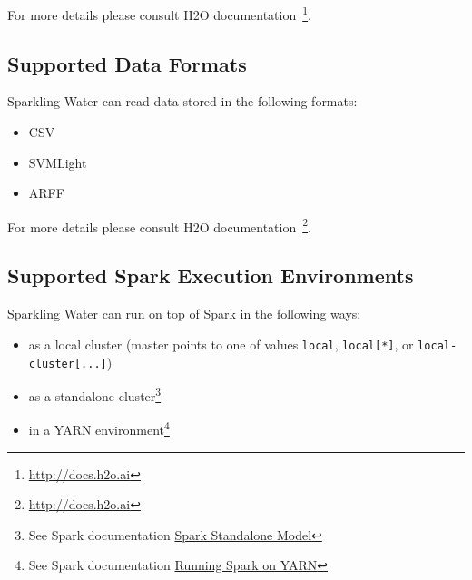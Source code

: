 For more details please consult H2O documentation~\footnote{\url{http://docs.h2o.ai}}.

\subsection{Supported Data Formats}

Sparkling Water can read data stored in the following formats:

\begin{itemize}
  \item CSV
  \item SVMLight
  \item ARFF
\end{itemize}

For more details please consult H2O documentation~\footnote{\url{http://docs.h2o.ai}}.

\subsection{Supported Spark Execution Environments}

Sparkling Water can run on top of Spark in the following ways:

\begin{itemize}
  \item as a local cluster (master points to one of values \texttt{local},
\texttt{local[*]}, or \texttt{local-cluster[...]})
  \item as a standalone cluster\footnote{See Spark documentation
\href{http://spark.apache.org/docs/latest/spark-standalone.html}{Spark
Standalone Model}}
  \item in a YARN environment\footnote{See Spark documentation \href{http://spark.apache.org/docs/latest/running-on-yarn.html}{Running
Spark on YARN}}

\end{itemize}

